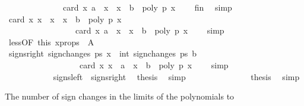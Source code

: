 \begin{isabellebody}
\ \ \ \ \ \ \ \ \ \ \ \ \ \ card\ {\isacharbraceleft}x{\isachardot}\ a\ {\isacharless}\ x\ {\isasymand}\ x\ {\isasymle}\ b\ {\isasymand}\ poly\ p\ x\ {\isacharequal}\ {}{\isacharbraceright}{\isachardoublequoteclose}\ \isamarkupfalse%
\ fin\ \isamarkupfalse%
\ simp\isanewline
\ \ \ \ \ \ \ \ \ \ \isamarkupfalse%
\ {\isachardoublequoteopen}card\ {\isacharbraceleft}x{\isacharprime}{\isachardot}\ x\ {\isacharless}\ x{\isacharprime}\ {\isasymand}\ x{\isacharprime}\ {\isasymle}\ b\ {\isasymand}\ poly\ p\ x{\isacharprime}\ {\isacharequal}\ {}{\isacharbraceright}\ {\isacharless}\ \isanewline
\ \ \ \ \ \ \ \ \ \ \ \ \ \ \ \ \ card\ {\isacharbraceleft}x{\isachardot}\ a\ {\isacharless}\ x\ {\isasymand}\ x\ {\isasymle}\ b\ {\isasymand}\ poly\ p\ x\ {\isacharequal}\ {}{\isacharbraceright}{\isachardoublequoteclose}\ \isamarkupfalse%
\ simp\isanewline
\ \ \ \ \ \ \ \ \ \ \isamarkupfalse%
\ less{\isacharparenleft}{}{\isacharparenright}{\isacharbrackleft}OF\ this\ x{\isacharunderscore}props{\isacharparenleft}{}{\isacharparenright}{\isacharbrackright}\ \ A\isanewline
\ \ \ \ \ \ \ \ \ \ \ \ \ \ \isamarkupfalse%
\ signs{\isacharunderscore}right{\isacharcolon}\ {\isachardoublequoteopen}sign{\isacharunderscore}changes\ ps\ x\ {\isacharminus}\ int\ {\isacharparenleft}sign{\isacharunderscore}changes\ ps\ b{\isacharparenright}\ {\isacharplus}\ {}\ {\isacharequal}\isanewline
\ \ \ \ \ \ \ \ \ \ \ \ \ \ \ \ \ \ card\ {\isacharbraceleft}x{\isacharprime}{\isachardot}\ x{\isacharprime}\ {\isachargreater}\ a\ {\isasymand}\ x{\isacharprime}\ {\isasymle}\ b\ {\isasymand}\ poly\ p\ x{\isacharprime}\ {\isacharequal}\ {}{\isacharbraceright}{\isachardoublequoteclose}\ \isamarkupfalse%
\ simp\isanewline
\ \ \ \ \ \ \ \ \ \ \isanewline
\ \ \ \ \ \ \ \ \ \ \isamarkupfalse%
\ signs{\isacharunderscore}left\ \ signs{\isacharunderscore}right\ \isamarkupfalse%
\ {\isacharquery}thesis\ \isamarkupfalse%
\ simp\isanewline
\ \ \ \ \ \ \ \ \isamarkupfalse%
\isanewline
\ \ \isamarkupfalse%
\isanewline
\ \ \isamarkupfalse%
\ {\isacharquery}thesis\ \isamarkupfalse%
\ simp\isanewline
{}\isamarkupfalse%
%
\endisatagproof
{\isafoldproof}%
%
\isadelimproof
%
\endisadelimproof
%
\begin{isamarkuptext}%
The number of sign changes in the limits of the polynomials to 

\end{isamarkuptext}
\end{isabellebody}
